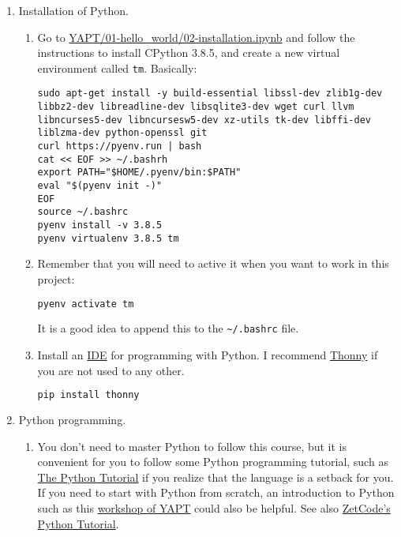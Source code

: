 \begin{enumerate}
  
\item Installation of Python.
  
  \begin{enumerate}
    
  \item Go to
    \href{https://github.com/vicente-gonzalez-ruiz/YAPT/blob/master/01-hello_world/02-installation.ipynb}{YAPT/01-hello\_world/02-installation.ipynb}
    \cite{YAPT} and follow the instructions to install CPython 3.8.5,
    and create a new virtual environment called \texttt{tm}. Basically:

\begin{verbatim}
sudo apt-get install -y build-essential libssl-dev zlib1g-dev libbz2-dev libreadline-dev libsqlite3-dev wget curl llvm libncurses5-dev libncursesw5-dev xz-utils tk-dev libffi-dev liblzma-dev python-openssl git
curl https://pyenv.run | bash
cat << EOF >> ~/.bashrh
export PATH="$HOME/.pyenv/bin:$PATH"
eval "$(pyenv init -)"
EOF
source ~/.bashrc
pyenv install -v 3.8.5
pyenv virtualenv 3.8.5 tm
\end{verbatim}

  \item Remember that you will need to active it when you want to
    work in this project:

    \begin{lstlisting}[language=Bash]
      pyenv activate tm
    \end{lstlisting}

    It is a good idea to append this to the \verb|~/.bashrc| file.
    
  \item Install an
    \href{https://en.wikipedia.org/wiki/Integrated_development_environment}{IDE}
    for programming with Python. I recommend
    \href{https://thonny.org/}{Thonny} if you are not used to any
    other.
    
    \begin{lstlisting}[language=Bash]
      pip install thonny
    \end{lstlisting}

  \end{enumerate}
  
\item Python programming.
  
  \begin{enumerate}
    
  \item You don't need to master Python to follow this course, but it
    is convenient for you to follow some Python programming tutorial,
    such as \href{https://docs.python.org/3/tutorial/}{The Python
    Tutorial} \cite{python-tutorial} if you realize that the language
    is a setback for you. If you need to start with Python from
    scratch, an introduction to Python such as
    this \href{https://github.com/vicente-gonzalez-ruiz/YAPT/tree/master/workshops/programacion_python_ESO}{workshop
    of YAPT} \cite{YAPT} could also be helpful. See
    also \href{http://zetcode.com/lang/python/}{ZetCode's Python
    Tutorial}.
    

\end{enumerate}
\end{enumerate}
